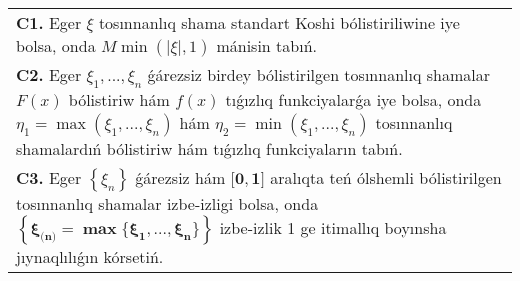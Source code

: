 \documentclass{article}
\begin{document}
\begin{tabular}{m{17cm}}
 \\
\textbf{C1.} Eger \(\xi\) tosınnanlıq shama standart Koshi bólistiriliwine iye bolsa, onda \(M\min\left( |\xi|,1 \right)\) mánisin tabıń.
 \\
\textbf{C2.} Eger \(\xi_{1},...,\xi_{n}\) ǵárezsiz birdey bólistirilgen tosınnanlıq shamalar \(F(x)\) bólistiriw hám \(f(x)\) tıǵızlıq funkciyalarǵa iye bolsa, onda \(\eta_{1} = \max\left( \xi_{1},...,\xi_{n} \right)\) hám \(\eta_{2} = \min\left( \xi_{1},...,\xi_{n} \right)\) tosınnanlıq shamalardıń bólistiriw hám tıǵızlıq funkciyaların tabıń.
 \\
\textbf{C3.} Eger \(\left\{ \xi_{n} \right\}\) ǵárezsiz hám \(\mathbf{\lbrack 0,1\rbrack}\) aralıqta teń ólshemli bólistirilgen tosınnanlıq shamalar izbe-izligi bolsa, onda \(\left\{ \mathbf{\xi}_{\mathbf{(}\mathbf{n}\mathbf{)}}\mathbf{=}\mathbf{\max}\mathbf{\{}\mathbf{\xi}_{\mathbf{1}}\mathbf{,...,}\mathbf{\xi}_{\mathbf{n}}\mathbf{\}} \right\}\) izbe-izlik 1 ge itimallıq boyınsha jıynaqlılıǵın kórsetiń.
 \\

\end{tabular}
\vspace{1cm}
\end{document}
